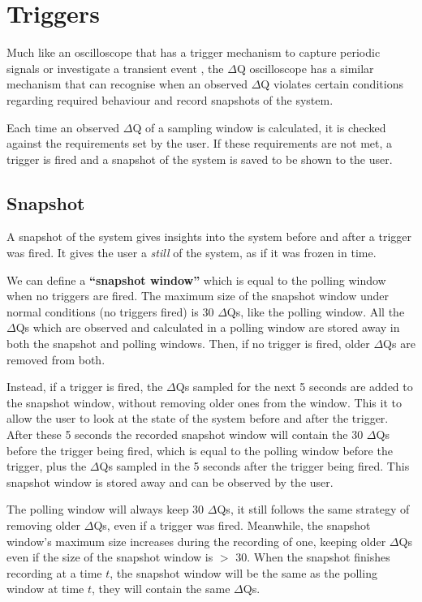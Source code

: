 \section{Triggers}
    Much like an oscilloscope that has a trigger mechanism to capture periodic signals or investigate a transient event \cite{osc-t}, the $\Delta$Q oscilloscope has a similar mechanism that can recognise when an observed $\Delta$Q violates certain conditions regarding required behaviour and record snapshots of the system.

    Each time an observed $\Delta$Q of a sampling window is calculated, it is checked against the requirements set by the user. If these requirements are not met, a trigger is fired and a snapshot of the system is saved to be shown to the user. 
    
    \subsection{Snapshot}
    A snapshot of the system gives insights into the system before and after a trigger was fired. It gives the user a \textit{still} of the system, as if it was frozen in time.
    
    We can define a \textbf{``snapshot window''} which is equal to the polling window when no triggers are fired. The maximum size of the snapshot window under normal conditions (no triggers fired) is 30 $\Delta$Qs, like the polling window.  All the $\Delta$Qs which are observed and calculated in a polling window are stored away in both the snapshot and polling windows. Then, if no trigger is fired, older $\Delta$Qs are removed from both.

    Instead, if a trigger is fired, the $\Delta$Qs sampled for the next 5 seconds are added to the snapshot window, without removing older ones from the window. This it to allow the user to look at the state of the system before and after the trigger. After these 5 seconds the recorded snapshot window will contain the 30 $\Delta$Qs before the trigger being fired, which is equal to the polling window before the trigger, plus the $\Delta$Qs sampled in the 5 seconds after the trigger being fired. This snapshot window is stored away and can be observed by the user.

The polling window will always keep 30 $\Delta$Qs, it still follows the same strategy of removing older $\Delta$Qs, even if a trigger was fired. Meanwhile, the snapshot window's maximum size increases during the recording of one, keeping older $\Delta$Qs even if the size of the snapshot window is $>$ 30. When the snapshot finishes recording at a time $t$, the snapshot window will be the same as the polling window at time $t$, they will contain the same $\Delta$Qs. 
